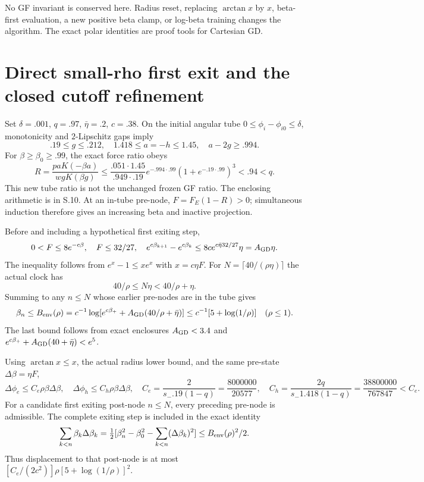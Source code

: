 \documentclass[11pt,a4paper]{article}
\begin{document}
No GF invariant is conserved here. Radius reset, replacing $\arctan x$ by $x$, beta-first evaluation, a new positive beta clamp, or log-beta training changes the algorithm. The exact polar identities are proof tools for Cartesian GD.

\section{Direct small-rho first exit and the closed cutoff refinement}

Set $\delta=.001$, $q=.97$, $\bar\eta=.2$, $c=.38$. On the initial angular tube $0\le\phi_i-\phi_{i0}\le\delta$, monotonicity and $2$-Lipschitz gaps imply
\[
 .19\le g\le.212,\quad1.418\le a=-h\le1.45,\quad a-2g\ge.994 .
\]
For $\beta\ge\beta_0\ge.99$, the exact force ratio obeys
\[
 R=\frac{paK(-\beta a)}{wgK(\beta g)}
 \le\frac{.051\cdot1.45}{.949\cdot.19}
 e^{-.994\cdot.99}(1+e^{-.19\cdot.99})^3<.94<q .
\]
This new tube ratio is not the unchanged frozen GF ratio. The enclosing arithmetic is in S.10. At an in-tube pre-node, $F=F_E(1-R)>0$; simultaneous induction therefore gives an increasing beta and inactive projection.

Before and including a hypothetical first exiting step,
\[
 0<F\le8e^{-c\beta},\quad F\le32/27,\quad
 e^{c\beta_{k+1}}-e^{c\beta_k}
 \le8c e^{c\bar\eta32/27}\eta=A_{\rm GD}\eta .
\]
The inequality follows from $e^x-1\le xe^x$ with $x=c\eta F$. For $N=\lceil40/(\rho\eta)\rceil$ the actual clock has
\[
 40/\rho\le N\eta<40/\rho+\eta .
\]
Summing to any $n\le N$ whose earlier pre-nodes are in the tube gives
\[
 \beta_n\le B_{\rm env}(\rho)=
 c^{-1}\log[e^{c\beta_+}+A_{\rm GD}(40/\rho+\bar\eta)]
 \le c^{-1}[5+\log(1/\rho)]\quad(\rho\le1).
\]
The last bound follows from exact enclosures $A_{\rm GD}<3.4$ and
$e^{c\beta_+}+A_{\rm GD}(40+\bar\eta)<e^5$.

Using $\arctan x\le x$, the actual radius lower bound, and the same pre-state $\Delta\beta=\eta F$,
\[
 \Delta\phi_e\le C_e\rho\beta\Delta\beta,\quad
 \Delta\phi_h\le C_h\rho\beta\Delta\beta,
\quad C_e=\frac{2}{s_-.19(1-q)}=\frac{8000000}{20577},
\quad C_h=\frac{2q}{s_-1.418(1-q)}=\frac{38800000}{767847}<C_e .
\]
For a candidate first exiting post-node $n\le N$, every preceding pre-node is admissible. The complete exiting step is included in the exact identity
\[
 \sum_{k<n}\beta_k\Delta\beta_k
 =\tfrac12[\beta_n^2-\beta_0^2-\sum_{k<n}(\Delta\beta_k)^2]
 \le B_{\rm env}(\rho)^2/2 .
\]
Thus displacement to that post-node is at most
$[C_e/(2c^2)]\rho[5+\log(1/\rho)]^2$.
\end{document}
